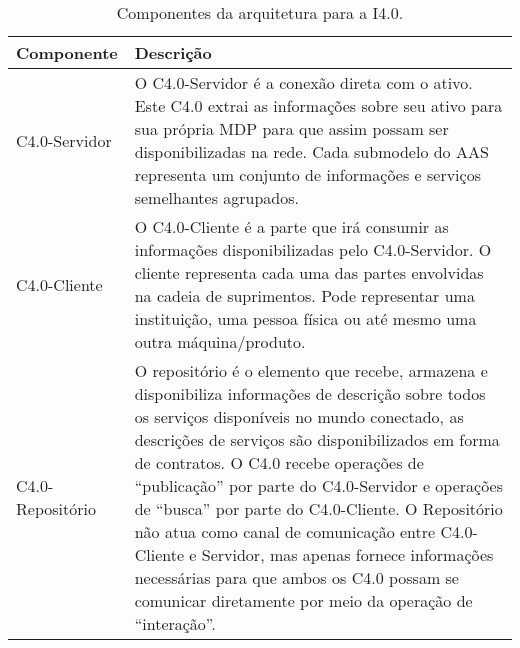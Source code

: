 \begin{table}[htb]
	\centering
	\caption{Componentes da arquitetura para a I4.0.}
	\begin{tabular}{p{3cm}p{12cm}}
		\hline
		\textbf{Componente}
		 & \textbf{Descrição}                                                                                                                                                                                                                                                                                                                                                                                                                                                                                                                                                       \\

		\hline
		C4.0-Servidor
		 & O C4.0-Servidor é a conexão direta com o ativo. Este C4.0 extrai as informações sobre seu ativo para sua própria MDP para que assim possam ser disponibilizadas na rede. Cada submodelo do AAS representa um conjunto de informações e serviços semelhantes agrupados.                                                                                                                                                                                                                                                                                                   \\

		\hline
		C4.0-Cliente
		 & O C4.0-Cliente é a parte que irá consumir as informações disponibilizadas pelo C4.0-Servidor. O cliente representa cada uma das partes envolvidas na cadeia de suprimentos. Pode representar uma instituição, uma pessoa física ou até mesmo uma outra máquina/produto.                                                                                                                                                                                                                                                                                                  \\

		\hline
		C4.0-Repositório
		 & O repositório é o elemento que recebe, armazena e disponibiliza informações de descrição sobre todos os serviços disponíveis no mundo conectado, as descrições de serviços são disponibilizados em forma de contratos. O C4.0 recebe operações de ``publicação'' por parte do C4.0-Servidor e operações de ``busca'' por parte do C4.0-Cliente. O Repositório não atua como canal de comunicação entre C4.0-Cliente e Servidor, mas apenas fornece informações necessárias para que ambos os C4.0 possam se comunicar diretamente por meio da operação de ``interação''. \\

		\hline
	\end{tabular}
	\label{tab:componentes-ws}
\end{table}


